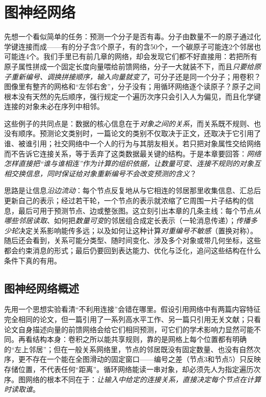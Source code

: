 \chapter{图神经网络}
\label{chap:graph-networks}

先想一个看似简单的任务：预测一个分子是否有毒。分子由数量不一的原子通过化学键连接而成——有的分子含5个原子，有的含50个，一个碳原子可能连2个邻居也可能连4个。我们手里已有前几章的网络，却会发现它们都不好直接用：若把所有原子属性拼成一个固定长度向量喂给前馈网络，分子一大就装不下，而且\emph{只要给原子重新编号、调换拼接顺序，输入向量就变了}，可分子还是同一个分子；用卷积？图像里有整齐的网格和“左邻右舍”，分子没有；用循环网络逐个读原子？原子之间根本没有天然的先后顺序，强行规定一个遍历次序只会引入人为偏见，而且化学键连接的对象未必在序列中相邻。

这些例子的共同点是：数据的核心信息在于\emph{对象之间的关系}，而关系既不规则、也没有顺序。预测论文类别时，一篇论文的类别不仅取决于正文，还取决于它引用了谁、被谁引用；社交网络中一个人的行为与其朋友相关。若只把对象属性交给网络而不告诉它连接关系，等于丢弃了这类数据最关键的结构。于是本章要回答：\emph{网络怎样直接把“谁与谁相连”作为计算的组织依据，让数量可变、连接不规则的对象互相交换信息，同时保证给对象重新编号不会改变预测的含义}？

思路是让信息\emph{沿边流动}：每个节点反复地从与它相连的邻居那里收集信息、汇总后更新自己的表示；经过若干轮，一个节点的表示就浓缩了它周围一片子结构的信息，最后可用于预测节点、边或整张图。这立刻引出本章的几条主线：每个节点\emph{从哪些邻居读取}、如何把\emph{数量可变}的邻居组合成定长表示（一轮消息传递）；\emph{传播多少轮}决定关系影响能传多远；以及如何让这种计算\emph{对重编号不敏感}（置换对称）。随后还会看到，关系可能分类型、随时间变化、涉及多个对象或带几何坐标，这些都会约束消息的形式；最后仍要回到表达能力、优化与泛化，追问这些结构在什么条件下真的有用。

\section{图神经网络概述}
\label{sec:gnn-overview}

先用一个思想实验看清“不利用连接”会错在哪里。假设引用网络中有两篇内容特征完全相同的论文，但一篇引用了一系列高水平工作、另一篇只引用无关文献；只看论文自身描述向量的前馈网络会给它们相同预测，可它们的学术影响力显然可能不同。再看结构本身：卷积之所以能共享规则，靠的是网格上每个位置都有明确的“左上邻居”；但在一般关系网络里，节点的邻居既没有固定数量、也没有自然次序，更不存在一个能在全图滑动的固定窗口——编号之差（节点3和节点5）只反映存储位置，不代表任何“距离”。循环网络能读一串对象，却必须先人为指定遍历次序。图网络的根本不同在于：\emph{让输入中给定的连接关系，直接决定每个节点在计算时读取谁}。


